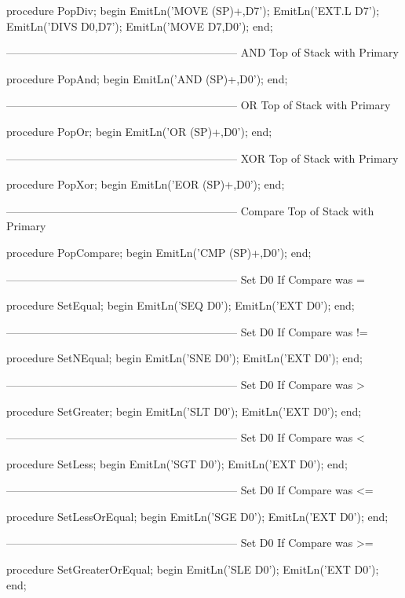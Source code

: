 \documentclass[float=false, crop=false]{standalone}
\begin{document}
\begin{code}
procedure PopDiv;
begin
   EmitLn('MOVE (SP)+,D7');
   EmitLn('EXT.L D7');
   EmitLn('DIVS D0,D7');
   EmitLn('MOVE D7,D0');
end;


{---------------------------------------------------------------}
{ AND Top of Stack with Primary }

procedure PopAnd;
begin
   EmitLn('AND (SP)+,D0');
end;


{---------------------------------------------------------------}
{ OR Top of Stack with Primary }

procedure PopOr;
begin
   EmitLn('OR (SP)+,D0');
end;


{---------------------------------------------------------------}
{ XOR Top of Stack with Primary }

procedure PopXor;
begin
   EmitLn('EOR (SP)+,D0');
end;


{---------------------------------------------------------------}
{ Compare Top of Stack with Primary }

procedure PopCompare;
begin
   EmitLn('CMP (SP)+,D0');
end;


{---------------------------------------------------------------}
{ Set D0 If Compare was = }

procedure SetEqual;
begin
   EmitLn('SEQ D0');
   EmitLn('EXT D0');
end;


{---------------------------------------------------------------}
{ Set D0 If Compare was != }

procedure SetNEqual;
begin
   EmitLn('SNE D0');
   EmitLn('EXT D0');
end;


{---------------------------------------------------------------}
{ Set D0 If Compare was > }

procedure SetGreater;
begin
   EmitLn('SLT D0');
   EmitLn('EXT D0');
end;


{---------------------------------------------------------------}
{ Set D0 If Compare was < }

procedure SetLess;
begin
   EmitLn('SGT D0');
   EmitLn('EXT D0');
end;


{---------------------------------------------------------------}
{ Set D0 If Compare was <= }

procedure SetLessOrEqual;
begin
   EmitLn('SGE D0');
   EmitLn('EXT D0');
end;


{---------------------------------------------------------------}
{ Set D0 If Compare was >= }

procedure SetGreaterOrEqual;
begin
   EmitLn('SLE D0');
   EmitLn('EXT D0');
end;



\end{code}
\end{document}
